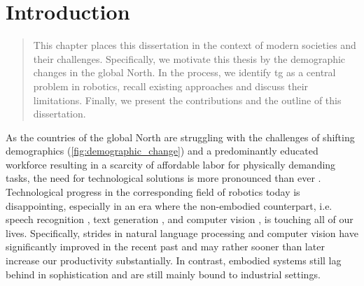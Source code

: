 \chapter{Introduction} %
\label{cha:intro}

\acresetall


\begin{abstract}
This chapter places this dissertation in the context of
modern societies and their challenges. Specifically, we
motivate this thesis by the demographic changes in the
global North. In the process, we identify
\acl{tg} as a central problem in robotics, recall existing
approaches and discuss their limitations. Finally, we
present the contributions and the outline of this
dissertation.
\end{abstract}

\newpage


As the countries of the global North are struggling with the
challenges of shifting demographics
(\cref{fig:demographic_change}) and a predominantly educated
workforce resulting in a scarcity of affordable labor for
physically demanding tasks, the need for technological
solutions is more pronounced than ever
\cite{ince2015economic,mcgrath2021report,astrov2021economies}.
Technological progress in the
corresponding field of robotics today is disappointing,
especially in an era where the non-embodied counterpart,
i.e. speech recognition \cite{radford2023robust},
text generation \cite{hoffmann2022training},
and computer vision \cite{voulodimos2018deep}, is
touching all of our lives. Specifically, strides in natural
language processing and computer vision have significantly
improved in the recent past and may rather sooner than later
increase our productivity substantially. In contrast, 
embodied systems still lag behind in
sophistication and are still mainly bound to industrial
settings.

